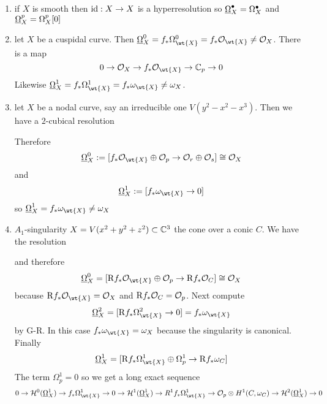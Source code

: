 \documentclass[12pt]{article}
\newcommand{\R}{\mathrm{R}}
\renewcommand{\cH}{\mathcal{H}}
\begin{document}
\begin{example}
\begin{enumerate}
\item if $X$ is smooth then $\mathrm{id} : X \to X$ is a hyperresolution so $\underline{\Omega}_X^\bullet = \Omega_X^\bullet$ and $\underline{\Omega}_X^p = \Omega_X^p [0]$
\item let $X$ be a cuspidal curve. Then $\ul{\Omega}_X^0 = f_* \Omega_{\wt{X}}^0 = f_* \struct{\wt{X}} \neq \struct{X}$. There is a map
\[ 0 \to \struct{X} \to f_* \struct{\wt{X}} \to \CC_p \to 0 \]
Likewise $\ul{\Omega}^1_X = f_* \Omega^1_{\wt{X}} = f_* \omega_{\wt{X}} \neq \omega_X$.
\item let $X$ be a nodal curve, say an irreducible one $V(y^2 - x^2 - x^3)$. Then we have a $2$-cubical resolution
\begin{center}
\end{center}
Therefore
\[ \ul{\Omega}_X^0 := [ f_* \struct{\wt{X}} \oplus \struct{p} \to \struct{r} \oplus \struct{s}] \cong \struct{X} \]
and
\[ \ul{\Omega}_X^1 := [ f_* \omega_{\wt{X}} \to 0] \]
so $\ul{\Omega}_X^1 = f_* \omega_{\wt{X}} \neq \omega_X$
\item $A_1$-singularity $X = V(x^2 + y^2 + z^2) \subset \mathbb{C}^3$ the cone over a conic $C$. We have the resolution
\begin{center}
\end{center}
and therefore
\[ \ul{\Omega}_X^0 = [ \R f_* \struct{\wt{X}} \oplus \struct{p} \to \R f_* \struct{C}] \cong \struct{X} \]
because $\R f_* \struct{\wt{X}} = \struct{X}$ and $\R f_* \struct{C} = \struct{p}$. Next compute
\[ \ul{\Omega}_X^2 = [ \R f_* \Omega_{\wt{X}}^2 \to 0] = f_* \omega_{\wt{X}} \]
by G-R. In this case $f_* \omega_{\wt{X}} = \omega_X$ because the singularity is canonical. Finally
\[ \ul{\Omega}_X^1 = [ \R f_* \Omega_{\wt{X}}^1 \oplus \Omega^1_{p} \to \R f_* \omega_C] \]
The term $\Omega^1_p = 0$ so we get a long exact sequence
\[ 0 \to \cH^0(\ul{\Omega}^1_X) \to f_* \Omega_{\wt{X}}^1 \to 0 \to \cH^1(\ul{\Omega}^1_X) \to R^1 f_* \Omega_{\wt{X}}^1 \to \struct{p} \ot H^1(C, \omega_C) \to \cH^2(\ul{\Omega}_X^1) \to 0 \]

\end{enumerate}
\end{example}
\end{document}
